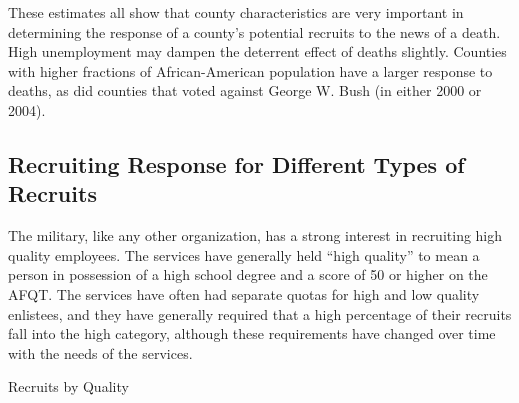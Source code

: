 \documentclass[12pt] {article}
\begin{document}
These estimates all show that county characteristics are very important
in determining the response of a county's potential recruits to the
news of a death. High unemployment may dampen the deterrent effect of deaths slightly.
Counties with higher fractions of African-American population have
a larger response to deaths, as did counties that voted against George
W. Bush (in either 2000 or 2004).


\subsection{Recruiting Response for Different Types of Recruits \label{sub:Different Recruit Types}}


The military, like any other organization, has a strong interest in
recruiting high quality employees. The services have generally held {}``high
quality'' to mean a person in possession of a high school degree
and a score of 50 or higher on the AFQT. The services have often had
separate quotas for high and low quality enlistees, and they have
generally required that a high percentage of their recruits fall into
the high category, although these requirements have changed over time
with the needs of the services. 

\begin{table}
\caption{Recruits by Quality}
\label{Flo: Recs by QualityLN}
\end{table}
\end{document}
